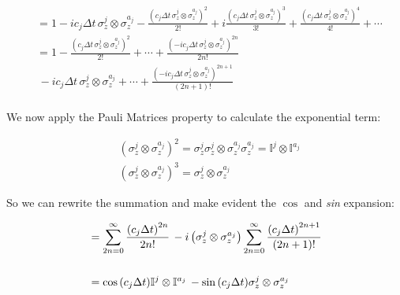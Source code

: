\documentclass[a4paper,12pt]{article}
\begin{document}
	  \begin{align*}
	  	&= 1 - i c_j \Delta t \, \sigma_{z}^{j} \otimes \sigma_{z}^{a_j} - \frac{\left( c_j \Delta t \, \sigma_{z}^{j} \otimes \sigma_{z}^{a_j} \right)^2}{2!} + i \frac{\left( c_j \Delta t \, \sigma_{z}^{j} \otimes \sigma_{z}^{a_j} \right)^3}{3!} + \frac{\left( c_j \Delta t \, \sigma_{z}^{j} \otimes \sigma_{z}^{a_j} \right)^4}{4!} + \cdots  \\
	  	&=1 - \frac{\left( c_j \Delta t \, \sigma_{z}^{j} \otimes \sigma_{z}^{a_j} \right)^2}{2!} + \cdots  + \frac{\left( -i c_j \Delta t \, \sigma_{z}^{j} \otimes \sigma_{z}^{a_j} \right)^{{2n}}}{2n!}  \\
	  	&\,- i c_j\Delta t \, \sigma_{z}^{j} \otimes \sigma_{z}^{a_j} + \cdots  + \frac{\left( -i c_j \Delta t \, \sigma_{z}^{j} \otimes \sigma_{z}^{a_j} \right)^{{2n+1}}}{(2n+1)!} \\ 
	  \end{align*}
	  
	  \begin{flushleft}
	  	We now apply the Pauli Matrices property to calculate the exponential term: 
	  \end{flushleft}
	  
	  \begin{equation}
	  	\begin{aligned}
	  		&\left(\sigma_{z}^{j} \otimes \sigma_{z}^{a_j} \right)^{2} = \sigma_{z}^{j} \sigma_{z}^{j} \otimes \sigma_{z}^{a_j} \sigma_{z}^{a_j} = \mathbb{I}^{j} \otimes \mathbb{I}^{a_j} \\
	  		&\left(\sigma_{z}^{j} \otimes \sigma_{z}^{a_j} \right)^{3} = \sigma_{z}^{j} \otimes \sigma_{z}^{a_j}
	  	\end{aligned}
	  \end{equation}
	  
	  \begin{flushleft}
	  	So we can rewrite the summation and make evident the $ \cos $ and \textit{sin} expansion:
	  \end{flushleft}
	  
	  \begin{align}
	  	&=\sum_{2n=0}^{\infty}
	  	{ \frac{\left( c_j \Delta t \right)^{{2n}}}{2n!} } \, - i \left(\sigma_{z}^{j} \otimes \sigma_{z}^{a_j} \right) \sum_{2n=0}^{\infty}{ \frac{\left( c_j \Delta t  \right)^{{2n+1}}}{(2n+1)!} } \notag \\
	  	\notag \\	
	  	&= \cos{\left(c_j \Delta t\right)} \mathbb{I}^{j} \otimes \mathbb{I}^{a_j} \, - \sin{\left(c_j \Delta t \right)} \sigma_{z}^{j} \otimes \sigma_{z}^{a_j}
	  \end{align}
	  
\end{document}

